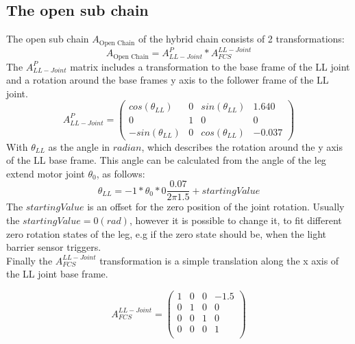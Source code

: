 \documentclass[12pt,a4paper]{article}
\begin{document}
\subsection{The open sub chain}
The open sub chain $A_{\text{Open Chain}}$ of the hybrid chain consists of 2 transformations:
\begin{equation}
    A_{\text{Open Chain}} = A_{LL-Joint}^{P} * A_{FCS}^{LL-Joint} 
\end{equation}
The $A_{LL-Joint}^{P}$ matrix includes a transformation to the base frame of the LL joint and a rotation around the base frames y axis to the follower frame of the LL joint.
\begin{equation}
     A_{LL-Joint}^{P} = 
     \begin{pmatrix}
     cos(\theta_{LL}) & 0 & sin(\theta_{LL}) & 1.640\\
     0 & 1 & 0 & 0\\
     -sin(\theta_{LL}) & 0 & cos(\theta_{LL}) & -0.037
     \end{pmatrix}
\end{equation}
With $\theta_{LL}$ as the angle in $radian$, which describes the rotation around the y axis of the LL base frame. This angle can be calculated from the angle of the leg extend motor joint $\theta_0$, as follows:
\begin{equation}
    \theta_{LL} = -1* \theta_0 * 0\frac{0.07}{2\pi1.5} + startingValue
\end{equation}
The $startingValue$ is an offset for the zero position of the joint rotation. Usually the $startingValue = 0 (rad)$, however it is possible to change it, to fit different zero rotation states of the leg, e.g if the zero state should be, when the light barrier sensor triggers. \\

Finally the $ A_{FCS}^{LL-Joint}$ transformation is a simple translation along the x axis of the LL joint base frame.

\begin{equation}
    A_{FCS}^{LL-Joint} = 
    \begin{pmatrix}
    1 & 0 & 0 & -1.5\\
    0 & 1 & 0 & 0\\
    0 & 0 & 1 & 0\\
    0 & 0 & 0 & 1\\
    \end{pmatrix}
\end{equation}
\end{document}
